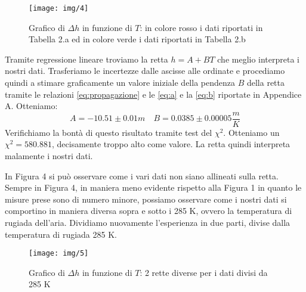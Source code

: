 \begin{figure}[H]
\centering
\texttt{[image: img/4]}
\caption{Grafico di $\Delta h$ in funzione di $T$: in colore rosso i dati riportati in Tabella 2.a ed in colore verde i dati riportati in Tabella 2.b }
\end{figure}

Tramite regressione lineare troviamo la retta $h = A+BT$ che meglio interpreta i nostri dati. 
Trasferiamo le incertezze dalle ascisse alle ordinate e procediamo quindi a stimare graficamente un valore iniziale della pendenza $B$ della retta tramite le relazioni \eqref{eq:propagazione} e le \eqref{eq:a} e la \eqref{eq:b} riportate in Appendice A.
Otteniamo:
\[A = -10.51 \pm 0.01 m \quad  B = 0.0385 \pm 0.00005\frac{m}{K} \]
Verifichiamo la bontà di questo risultato tramite test del $\chi^2$. 
Otteniamo un $\chi^2 = 580.881$, decisamente troppo alto come valore.
La retta quindi interpreta malamente i nostri dati. 



In Figura 4 si può osservare come i vari dati non siano allineati sulla retta. 
Sempre in Figura 4, in maniera meno evidente rispetto alla Figura 1 in quanto le misure prese sono di numero minore, possiamo osservare come i nostri dati si comportino in maniera diversa sopra e sotto i 285 K, ovvero la temperatura di rugiada dell'aria. 
\newline
Dividiamo nuovamente l'esperienza in due parti, divise dalla temperatura di rugiada 285 K.

\begin{figure}[H]
\centering
\texttt{[image: img/5]}
\caption{Grafico di $\Delta h$ in funzione di $T$: 2 rette diverse per i dati divisi da 285 K}
\end{figure}

